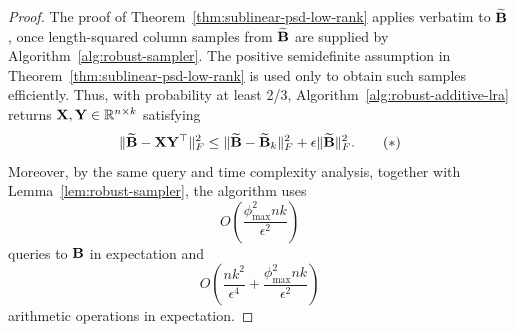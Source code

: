\begin{proof}
The proof of Theorem~\ref{thm:sublinear-psd-low-rank} applies verbatim to
\(\widetilde{\mathbf{B}}\), once length-squared column samples from
\(\widetilde{\mathbf{B}}\) are supplied by Algorithm~\ref{alg:robust-sampler}. The
positive semidefinite assumption in Theorem~\ref{thm:sublinear-psd-low-rank}
is used only to obtain such samples efficiently.  Thus, with
probability at least 2/3, Algorithm~\ref{alg:robust-additive-lra} returns
\(\mathbf{X},\mathbf{Y}\in\mathbb{R}^{n\times k}\) satisfying
\[
    \|\widetilde{\mathbf{B}}-\mathbf{X}\mathbf{Y}^\top\|_F^2
    \leq
    \|\widetilde{\mathbf{B}}-\widetilde{\mathbf{B}}_k\|_F^2
    +
    \epsilon\|\widetilde{\mathbf{B}}\|_F^2.\tag{$\ast$}
\]
Moreover, by the same query and time complexity analysis, together with
Lemma~\ref{lem:robust-sampler}, the algorithm uses
\[
    O\left(\frac{\phi_{\max}^2 n k}{\epsilon^2}\right)
\]
queries to \(\mathbf{B}\) in expectation and
\[
    O\left(
        \frac{n k^2}{\epsilon^4}
        +
        \frac{\phi_{\max}^2 n k}{\epsilon^2}
    \right)
\]
arithmetic operations in expectation. 


\end{proof}
